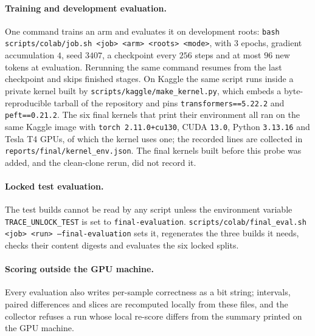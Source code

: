\paragraph{Training and development evaluation.} One command trains an arm and evaluates it on
development roots:
\texttt{bash scripts/colab/job.sh <job> <arm> <roots> <mode>}, with $3$ epochs, gradient
accumulation $4$, seed $3407$, a checkpoint every $256$ steps and at most $96$ new tokens at
evaluation. Rerunning the same command resumes from the last checkpoint and skips finished
stages. On Kaggle the same script runs inside a private kernel built by
\texttt{scripts/kaggle/make\_kernel.py}, which embeds a byte-reproducible tarball of the
repository and pins \texttt{transformers==5.22.2} and \texttt{peft==0.21.2}.
The six final kernels that print their environment all ran on the same Kaggle image with
\texttt{torch 2.11.0+cu130}, CUDA \texttt{13.0}, Python \texttt{3.13.16} and Tesla T4 GPUs, of which the
kernel uses one; the recorded lines are collected in \texttt{reports/final/kernel\_env.json}. The final
kernels built before this probe was added, and the clean-clone rerun, did not record it.

\paragraph{Locked test evaluation.} The test builds cannot be read by any script unless the
environment variable \texttt{TRACE\_UNLOCK\_TEST} is set to \texttt{final-evaluation}.
\texttt{scripts/colab/final\_eval.sh <job> <run> --final-evaluation} sets it, regenerates the
three builds it needs, checks their content digests and evaluates the six locked splits.

\paragraph{Scoring outside the GPU machine.} Every evaluation also writes per-sample
correctness as a bit string; intervals, paired differences and slices are recomputed locally
from these files, and the collector refuses a run whose local re-score differs from the
summary printed on the GPU machine.


